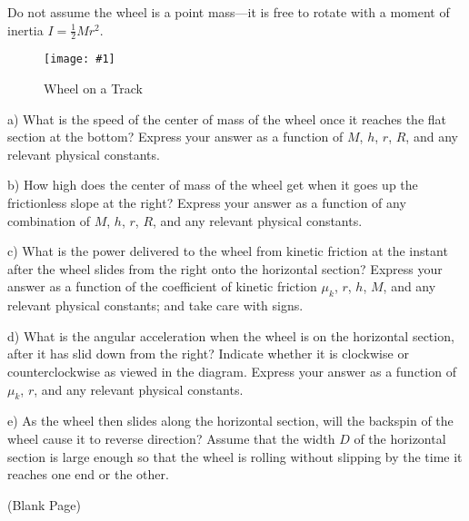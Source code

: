 \documentclass[11pt]{article}
\newcommand{\fig}[4]{
    \begin{figure}[H]
        \centering
        \texttt{[image: \#1]}
        \caption{#2}
        \label{exp4fit}
    \end{figure}
}
\theoremstyle{gangnamstyle}{\newtheorem{definition}{Definition}[]}
\theoremstyle{gangnamstyle}{\newtheorem{example}{Example}[]}
\theoremstyle{gangnamstyle}{\newtheorem{problem}{Problem}[]}
\begin{document}
Do not assume the wheel is a point mass---it is free to rotate with a moment of inertia $I = \frac{1}{2}Mr^2$. 

\fig{figs/mt2/tbp6.png}{Wheel on a Track}{0.6}{0}

a) What is the speed of the center of mass of the wheel once it reaches the flat section at the bottom? Express your answer as a function of $M$, $h$, $r$, $R$, and any relevant physical constants.

b) How high does the center of mass of the wheel get when it goes up the frictionless slope at the right? Express your answer as a function of any combination of $M$, $h$, $r$, $R$, and any relevant physical constants.

c) What is the power delivered to the wheel from kinetic friction at the instant after the wheel slides from the right onto the horizontal section? Express your answer as a function of the coefficient of kinetic friction $\mu_k$, $r$, $h$, $M$, and any relevant physical constants; and take care with signs.

d) What is the angular acceleration when the wheel is on the horizontal section, after it has slid down from the right? Indicate whether it is clockwise or counterclockwise as viewed in the diagram. Express your answer as a function of $\mu_k$, $r$, and any relevant physical constants.

e) As the wheel then slides along the horizontal section, will the backspin of the wheel cause it to reverse direction? Assume that the width $D$ of the horizontal section is large enough so that the wheel is rolling without slipping by the time it reaches one end or the other. 

\pagebreak

\begin{center}
(Blank Page)
\end{center}

\pagebreak
\end{document}

